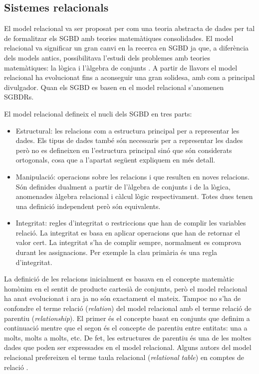  


\subsection{Sistemes relacionals}
\label{sec:estat:sgbdr}

El model relacional va ser proposat per \textcite{codd69,codd70} com una
teoria abstracta de dades per tal de formalitzar els \gls{SGBD} amb teories
matemàtiques consolidades.  El model relacional va significar un gran
canvi en la recerca en \gls{SGBD} ja que, a diferència dels models antics,
possibilitava l'estudi dels problemes amb teories matemàtiques: la
lògica i l'àlgebra de
conjunts \parencite{atzeni13:relational_model_dead}.  A partir de
llavors el model relacional ha evolucionat fins a aconseguir una gran
solidesa, amb \textcite{date04:introduction8,date06,date:dictionary} com
a principal divulgador.  Quan els \gls{SGBD} es basen en el model relacional
s'anomenen \glspl{SGBDR}.



El model relacional defineix el nucli dels \gls{SGBD} en tres parts:
\begin{itemize}
\item Estructural: les relacions com a estructura principal per a
  representar les dades. Els tipus de dades també són necessaris per a
  representar les dades però no es defineixen en l'estructura
  principal sinó que són considerats ortogonals, cosa que a l'apartat
  següent expliquem en més detall.

\item Manipulació: operacions sobre les relacions i que resulten en
  noves relacions. Són definides dualment a partir de l'àlgebra de
  conjunts i de la lògica, anomenades àlgebra relacional i càlcul
  lògic respectivament. Totes dues tenen una definició independent
  però són equivalents.

\item Integritat: regles d'integritat o restriccions que han de
  complir les variables relació. La integritat es basa en aplicar
  operacions que han de retornar el valor cert. La integritat s'ha de
  complir sempre, normalment es comprova durant les assignacions.  Per
  exemple la clau primària és una regla d'integritat.
\end{itemize}


La definició de les relacions inicialment es basava en el concepte
matemàtic homònim en el sentit de producte cartesià de conjunts, però
el model relacional ha anat evolucionat i ara ja no són exactament el
mateix. Tampoc no s'ha de confondre el terme relació (\emph{relation})
del model relacional amb el terme relació de parentiu
(\emph{relationship}). El primer és el concepte basat en conjunts que
definim a continuació mentre que el segon és el concepte de parentiu
entre entitats: una a molts, molts a molts, etc. De fet, les
estructures de parentiu és una de les moltes dades que poden ser
expressades en el model relacional. Alguns autors del model relacional
prefereixen el terme taula relacional (\emph{relational table}) en
comptes de relació \parencite{dbdebunk}.



